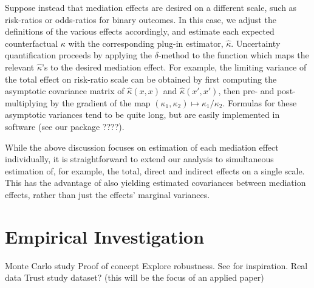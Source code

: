 \documentclass{article}
\begin{document}
Suppose instead that mediation effects are desired on a different scale, such as risk-ratios or odds-ratios for binary outcomes. In this case, we adjust the definitions of the various effects accordingly, and estimate each expected counterfactual $\kappa$ with the corresponding plug-in estimator, $\hat{\kappa}$. Uncertainty quantification proceeds by applying the $\delta$-method to the function which maps the relevant $\hat{\kappa}$'s to the desired mediation effect. For example, the limiting variance of the total effect on risk-ratio scale can be obtained by first computing the asymptotic covariance matrix of $\hat{\kappa}(x,x)$ and $\hat{\kappa}(x',x')$, then pre- and post-multiplying by the gradient of the map $(\kappa_1, \kappa_2) \mapsto \kappa_1 / \kappa_2$. Formulas for these asymptotic variances tend to be quite long, but are easily implemented in software (see our package ????).

While the above discussion focuses on estimation of each mediation effect individually, it is straightforward to extend our analysis to simultaneous estimation of, for example, the total, direct and indirect effects on a single scale. This has the advantage of also yielding estimated covariances between mediation effects, rather than just the effects' marginal variances.



\section{Empirical Investigation}

\begin{outline}
    \1 Monte Carlo study
        \2 Proof of concept
        \2 Explore robustness. See \citet{Sam23} for inspiration.
    \1 Real data
        \2 Trust study dataset? (this will be the focus of an applied paper)
\end{outline}


\end{document}
